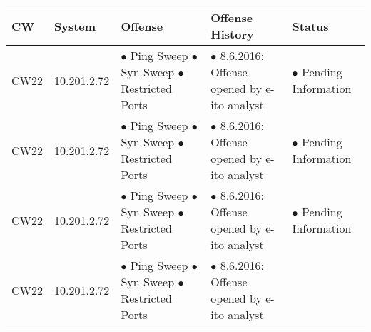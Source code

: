 \begin{center}
\begin{longtable}{|p{2cm}|p{}|p{4cm}|p{6cm}|p{4cm}|}
\hline %
\textbf{CW} & %
\textbf{System} & %
\textbf{Offense} & %
\textbf{Offense History} & %
\textbf{Status} %
\\\endhead

\hline %
CW22 & %

10.201.2.72 & %

$\bullet$ Ping Sweep \newline %
$\bullet$ Syn Sweep \newline
$\bullet$ Restricted Ports &
			
$\bullet$ 8.6.2016: Offense opened by e-ito analyst & %
			
$\bullet$ Pending Information %
\\
\hline %
CW22 & %

10.201.2.72 & %

$\bullet$ Ping Sweep \newline %
$\bullet$ Syn Sweep \newline
$\bullet$ Restricted Ports &

$\bullet$ 8.6.2016: Offense opened by e-ito analyst & %

$\bullet$ Pending Information %
\\
\hline %
CW22 & %

10.201.2.72 & %

$\bullet$ Ping Sweep \newline %
$\bullet$ Syn Sweep \newline
$\bullet$ Restricted Ports &

$\bullet$ 8.6.2016: Offense opened by e-ito analyst & %

$\bullet$ Pending Information %
\\
\hline %
CW22 & %

10.201.2.72 & %

$\bullet$ Ping Sweep \newline %
$\bullet$ Syn Sweep \newline
$\bullet$ Restricted Ports &

$\bullet$ 8.6.2016: Offense opened by e-ito analyst & %


\end{longtable}
\end{center}
